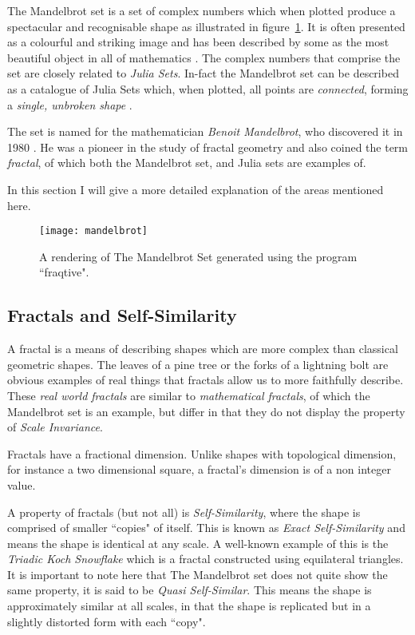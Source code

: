The Mandelbrot set is a set of complex numbers which when plotted produce a spectacular and recognisable shape as illustrated in figure~\ref{fig:mandelimg}.
It is often presented as a colourful and striking image and has been described by some as the most beautiful object in all of mathematics \cite[p.~234]{chaosfract}.
The complex numbers that comprise the set are closely related to \textit{Julia Sets}. 
In-fact the Mandelbrot set can be described as a catalogue of Julia Sets which, when plotted, all points are \textit{connected}, 
forming a \textit{single, unbroken shape} \cite[p.~177]{fractimg}.

The set is named for the mathematician \textit{Benoit Mandelbrot}, who discovered it in 1980 \cite{fracnature , fractimg}. He was a pioneer in the study of 
fractal geometry and also coined the term \textit{fractal}, of which both the Mandelbrot set, and Julia sets are examples of. 

In this section I will give a more detailed explanation of the areas mentioned here. 

\begin{figure}[h]
  \caption{A rendering of The Mandelbrot Set generated using the program ``fraqtive"\cite{fraqtive}.}
  \label{fig:mandelimg}
  \centering
    \texttt{[image: mandelbrot]}
\end{figure}

\subsection*{Fractals and Self-Similarity} 
A fractal is a means of describing shapes which are more complex than classical geometric shapes. The leaves of a pine tree or the forks of a 
lightning bolt are obvious examples of real things that fractals allow us to more faithfully describe. 
These \textit{real world fractals} are similar to \textit{mathematical fractals}, 
of which the Mandelbrot set is an example, but differ in that they do not display the property of \textit{Scale Invariance}. 

Fractals have a fractional dimension. Unlike shapes with topological dimension, for instance a two dimensional square, 
a fractal's dimension is of a non integer value.

A property of fractals (but not all) is \textit{Self-Similarity}, where the shape is comprised of smaller ``copies" of itself. 
This is known as \textit{Exact Self-Similarity} and means the shape is identical at any scale.
A well-known example of this is the \textit{Triadic Koch Snowflake} which is a fractal constructed using equilateral triangles. 
It is important to note here that The Mandelbrot set does not quite show the same property, it is said to be 
\textit{Quasi Self-Similar}. This means the shape is approximately similar at all scales, in that the shape is replicated but in a slightly distorted
form with each ``copy".

